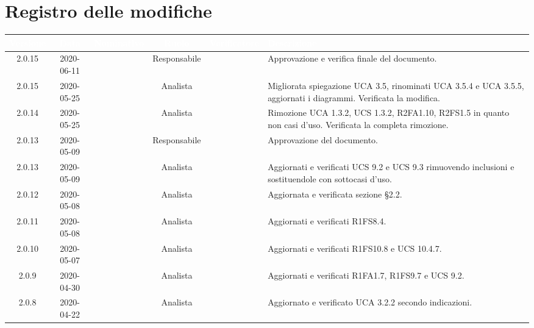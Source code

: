 \section*{Registro delle modifiche}
\setcounter{table}{-1}
{

\renewcommand{\arraystretch}{1.5}
\centering
\begin{longtable}{ c c  C{2.3cm} c C{3cm} C{3.2cm}}
\textcolor{white}{\textbf{Versione}} &
\textcolor{white}{\textbf{Data}}&
\textcolor{white}{\textbf{Nominativo}}&
\textcolor{white}{\textbf{Ruolo}}&
\textcolor{white}{\textbf{Verificatore}}&
\textcolor{white}{\textbf{Descrizione}}\\
\endhead

2.0.15 & 2020-06-11 & \PF{} & Responsabile & \MC{} & Approvazione e verifica finale del documento. \\

2.0.15 & 2020-05-25 & \AT{} & Analista & \DF{} & Migliorata spiegazione UCA 3.5, rinominati UCA 3.5.4 e UCA 3.5.5, aggiornati i diagrammi. Verificata la modifica. \\

2.0.14 & 2020-05-25 & \DF{} & Analista & \PF{} & Rimozione UCA 1.3.2, UCS 1.3.2, R2FA1.10, R2FS1.5 in quanto non casi d'uso. Verificata la completa rimozione. \\

2.0.13 & 2020-05-09 & \BR{} & Responsabile & \PF{} & Approvazione del documento. \\

2.0.13 & 2020-05-09 & \DF{} & Analista & \PF{} & Aggiornati e verificati UCS 9.2 e UCS 9.3 rimuovendo inclusioni e sostituendole con sottocasi d'uso.\\

2.0.12 & 2020-05-08 & \DF{} & Analista & \CE{} & Aggiornata e verificata sezione §2.2.\\

2.0.11 & 2020-05-08 & \AT{} & Analista & \CE{} & Aggiornati e verificati R1FS8.4. \\

2.0.10 & 2020-05-07 & \DF{} & Analista & \CE{} & Aggiornati e verificati R1FS10.8 e UCS 10.4.7. \\

2.0.9 & 2020-04-30 & \DF{} & Analista & \PF{} & Aggiornati e verificati R1FA1.7, R1FS9.7 e UCS 9.2. \\

2.0.8 & 2020-04-22 & \AT{} & Analista & \PF{} & Aggiornato e verificato UCA 3.2.2 secondo indicazioni. \\


\end{longtable}}
